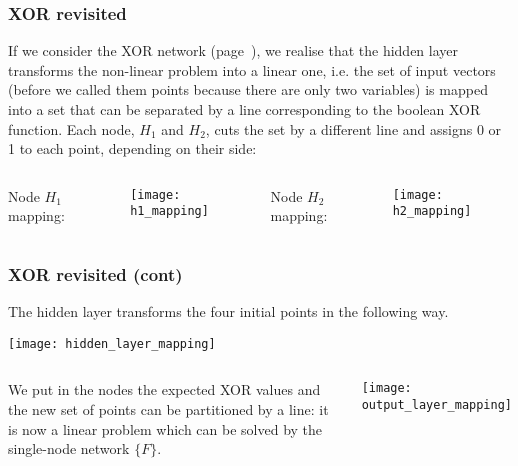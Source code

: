%
\begin{frame}
\frametitle{XOR revisited}
\label{xor}

If we consider the XOR network (page~\pageref{xor_graph}), we realise
that the hidden layer transforms the non-linear problem into a linear
one, i.e. the set of input vectors (before we called them points
because there are only two variables) is mapped into a set that can be
separated by a line corresponding to the boolean XOR function. Each
node, \(H_1\) and \(H_2\), cuts the set by a different line and
assigns 0 or 1 to each point, depending on their side:

\bigskip

\begin{columns}[t]

    Node \(H_1\) mapping:
    \begin{center}
      \texttt{[image: h1\_mapping]}
    \end{center}

    Node \(H_2\) mapping:
    \begin{center}
      \texttt{[image: h2\_mapping]}
    \end{center}

\end{columns}

\end{frame}

%
\begin{frame}
\frametitle{XOR revisited (cont)}

The hidden layer transforms the four initial points in the following
way.
\begin{center}
  \texttt{[image: hidden\_layer\_mapping]}
\end{center}
\begin{columns}[c]

   We put in the nodes the expected XOR values
  and the new set of points can be partitioned by a line: it is now a
  linear problem which can be solved by the single-node network
  \(\lbrace{F}\rbrace\).

  \begin{center}
    \texttt{[image: output\_layer\_mapping]}
  \end{center}

\end{columns}

\end{frame}


